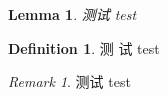 \documentclass[fontset=fandol]{ctexart}
\newtheorem{lem}{Lemma}
\theoremstyle{definition}
\newtheorem{defn}{Definition}
\theoremstyle{remark}
\newtheorem*{rem}{Remark}
\begin{document}
  \begin{lem} 测试 test \end{lem}
  \begin{defn} 测 试 test \end{defn}
  \begin{rem} 测试 test \end{rem}
\end{document}
